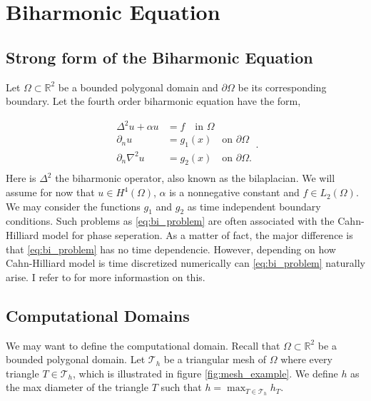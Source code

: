 \newpage
\section{ Biharmonic Equation}
\label{sec:ch1}


\subsection{Strong form of the Biharmonic Equation}%
\label{sub:strong_form_of_the_biharmonic_equation}


Let $\Omega \subset   \mathbb{R} ^2$ be a bounded polygonal domain and $\partial \Omega $ be its corresponding boundary. Let the fourth order biharmonic equation have the form,

\begin{equation}
\label{eq:bi_problem}
\begin{split}
    \Delta^2  u  + \alpha  u  & = f \quad \text{in } \Omega   \\
    \partial _{n} u & = g_1\left( x \right)  \quad \text{on } \partial \Omega  \\
    \partial _{n} \nabla ^2 u & = g_{2}\left( x \right)  \quad \text{on } \partial \Omega .  \\
\end{split}
.\end{equation}
Here is $\Delta ^2$ the biharmonic operator, also known as the bilaplacian. We will assume for now that $u \in H^{4}\left( \Omega  \right) $, $\alpha $ is a nonnegative constant and $f \in L_{2}\left( \Omega  \right) $. We may consider the functions $g_{1}$ and $g_{2}$ as time independent boundary conditions. Such problems as \eqref{eq:bi_problem} are often associated with the Cahn-Hilliard model
\cite{cahnhilliard1957} for phase seperation. As a matter of fact, the major difference is that \eqref{eq:bi_problem}
has no time dependencie. However, depending on how Cahn-Hilliard model is time discretized numerically can
\eqref{eq:bi_problem} naturally arise. I refer to \cite{brenner2012quadratic} for more informastion on this.

\subsection{Computational Domains}%
\label{sub:computational_domain}

We may want to define the computational domain. Recall that $\Omega \subset   \mathbb{R} ^2$ be a bounded polygonal domain. Let $\mathcal{T} _{h}$ be a triangular mesh of $\Omega$ where every triangle $T \in  \mathcal{T} _{h}$, which is illustrated
in figure \ref{fig:mesh_example}. We define $h$ as
the max diameter of the triangle $T$ such that $h = \max_{T \in \mathcal{T}_{h} }  h_T  $.

